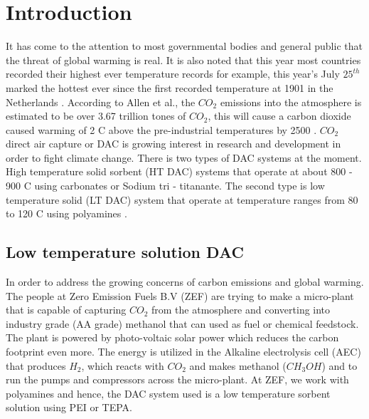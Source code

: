 \section{Introduction}
It has come to the attention to most governmental bodies and general public that the threat of global warming is real. It is also noted that this year most countries recorded their highest ever temperature records for example, this year's July $25^{th}$ marked the hottest ever since the first recorded temperature at 1901 in the Netherlands \cite{Pieters2019}. According to Allen et al., the $CO_2$ emissions into the atmosphere is estimated to be over 3.67 trillion tones of $CO_2$, this will cause a carbon dioxide caused warming of 2 \degree C above the pre-industrial temperatures by 2500 \cite{Allen2009}. $CO_2$ direct air capture or DAC is growing interest in research and development in order to fight climate change. There is two types of DAC systems at the moment. High temperature solid sorbent (HT DAC) systems that operate at about 800 - 900 \degree C using carbonates or Sodium tri - titanante. The second type is low temperature solid (LT DAC) system that operate at temperature ranges from 80 to 120 \degree C using polyamines \cite{Fasihi2019}.

\subsection{Low temperature solution DAC}
\noindent
In order to address the growing concerns of carbon emissions and global warming. The people at Zero Emission Fuels B.V (ZEF) are trying to make a micro-plant that is capable of capturing $CO_2$ from the atmosphere and converting into industry grade (AA grade) methanol that can used as fuel or chemical feedstock. The plant is powered by photo-voltaic solar power which reduces the carbon footprint even more. The energy is utilized in the Alkaline electrolysis cell (AEC) that produces $H_2$, which reacts with $CO_2$ and makes methanol ($CH_{3}OH$) and to run the pumps and compressors across the micro-plant. At ZEF, we work with polyamines and hence, the DAC system used is a low temperature sorbent solution using PEI or TEPA. 

